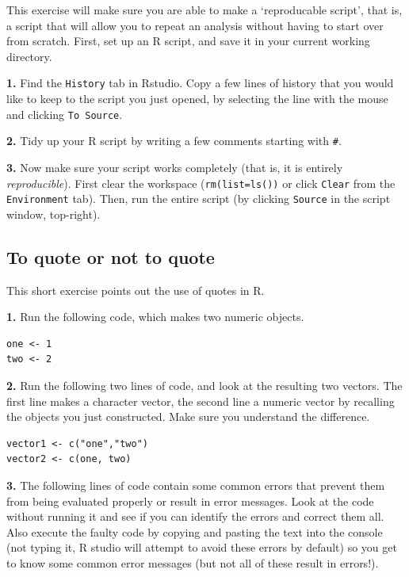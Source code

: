 \documentclass[]{book}
\begin{document}
This exercise will make sure you are able to make a `reproducable script', that is, a script that will allow you to repeat an analysis without having to start over from scratch. First, set up an R script, and save it in your current working directory.

\textbf{1.} Find the \texttt{History} tab in Rstudio. Copy a few lines of history that you would like to keep to the script you just opened, by selecting the line with the mouse and clicking \texttt{To\ Source}.

\textbf{2.} Tidy up your R script by writing a few comments starting with \texttt{\#}.

\textbf{3.} Now make sure your script works completely (that is, it is entirely \emph{reproducible}). First clear the workspace (\texttt{rm(list=ls())} or click \texttt{Clear} from the \texttt{Environment} tab). Then, run the entire script (by clicking \texttt{Source} in the script window, top-right).

\hypertarget{exquote}{%
\subsection{To quote or not to quote}\label{exquote}}

This short exercise points out the use of quotes in R.

\textbf{1.} Run the following code, which makes two numeric objects.

\begin{verbatim}
one <- 1
two <- 2
\end{verbatim}

\textbf{2.} Run the following two lines of code, and look at the resulting two vectors. The first line makes a character vector, the second line a numeric vector by recalling the objects you just constructed. Make sure you understand the difference.

\begin{verbatim}
vector1 <- c("one","two")
vector2 <- c(one, two)
\end{verbatim}

\textbf{3.} The following lines of code contain some common errors that prevent them from being evaluated properly or result in error messages. Look at the code without running it and see if you can identify the errors and correct them all. Also execute the faulty code by copying and pasting the text into the console (not typing it, R studio will attempt to avoid these errors by default) so you get to know some common error messages (but not all of these result in errors!).
\end{document}
